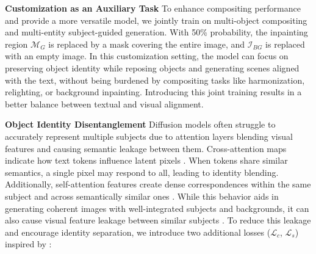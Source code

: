 \noindent
\textbf{Customization as an Auxiliary Task}  To enhance compositing performance and provide a more versatile model, we jointly train on multi-object compositing and multi-entity subject-guided generation. With 50\% probability, the inpainting region $\mathcal{M}_{G}$ is replaced by a mask covering the entire image, and $\mathcal{I}_{BG}$ is replaced with an empty image. In this customization setting, the model can focus on preserving object identity while reposing objects and generating scenes aligned with the text, without being burdened by compositing tasks like harmonization, relighting, or background inpainting. Introducing this joint training results in a better balance between textual and visual alignment. %

\noindent
\textbf{Object Identity Disentanglement} Diffusion models often struggle to accurately represent multiple subjects due to attention layers blending visual features and causing semantic leakage between them. Cross-attention maps indicate how text tokens influence latent pixels \cite{hertz2022prompt}. When tokens share similar semantics, a single pixel may respond to all, leading to identity blending. 
Additionally, self-attention features create dense correspondences within the same subject and across semantically similar ones \cite{dahary2024yourself,alaluf2024cross,cao2023masactrl}. While this behavior aids in generating coherent images with well-integrated subjects and backgrounds, it can also cause visual feature leakage between similar subjects \cite{dahary2024yourself}. To reduce this leakage and encourage identity separation, we introduce two additional losses ($\mathcal{L}_{c}$, $\mathcal{L}_{s}$) inspired by \cite{dahary2024yourself,xiao2024fastcomposer}:


